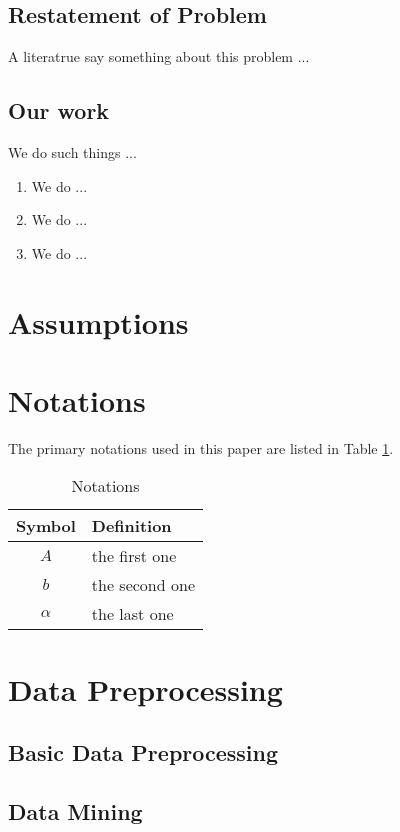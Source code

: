 \documentclass[12pt]{article}  %
\begin{document}
\subsection{Restatement of Problem}
A literatrue\cite{1} say something about this problem ...

\subsection{Our work}
We do such things ...

\begin{enumerate}[\bfseries 1.]
    \item We do ...
    \item We do ...
    \item We do ...
\end{enumerate}

\section{Assumptions}


\section{Notations}
The primary notations used in this paper are listed in Table \ref{tb:notation}.

\begin{table}[!htbp]
\begin{center}
\caption{Notations}
\begin{tabular}{cl}
	\toprule
	\multicolumn{1}{m{3cm}}{\centering Symbol}
	&\multicolumn{1}{m{8cm}}{\centering Definition}\\
	\midrule
	$A$&the first one\\
	$b$&the second one\\
	$\alpha$ &the last one\\
	\bottomrule
\end{tabular}\label{tb:notation}
\end{center}
\end{table}

\section{Data Preprocessing}
\subsection{Basic Data Preprocessing}
\subsection{Data Mining}
\end{document}
